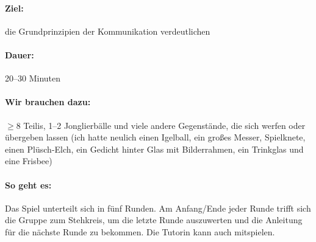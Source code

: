 \paragraph{Ziel:} die Grundprinzipien der Kommunikation verdeutlichen
\paragraph{Dauer:} 20--30 Minuten
\paragraph{Wir brauchen dazu:} $\geq 8$ Teilis, 1--2 Jonglierbälle und viele andere Gegenstände, die sich werfen oder übergeben lassen (ich hatte neulich einen Igelball, ein großes Messer, Spielknete, einen Plüsch-Elch, ein Gedicht hinter Glas mit Bilderrahmen, ein Trinkglas und eine Frisbee)
\paragraph{So geht es:} Das Spiel unterteilt sich in fünf Runden. Am Anfang/Ende jeder Runde trifft sich die Gruppe zum Stehkreis, um die letzte Runde auszuwerten und die Anleitung für die nächste Runde zu bekommen. Die Tutorin kann auch mitspielen.

